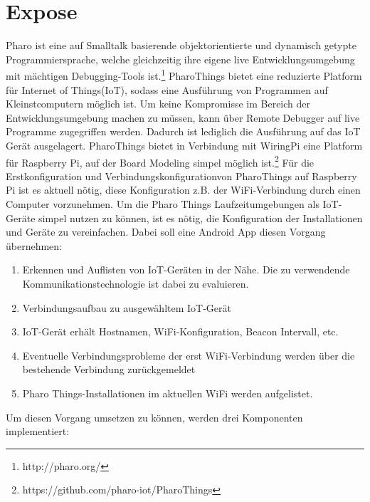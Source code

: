 \documentclass[12pt,a4paper]{article}
\begin{document}
    \section{Expose}
        Pharo ist eine auf Smalltalk basierende objektorientierte und dynamisch getypte Programmiersprache,
        welche gleichzeitig ihre eigene live Entwicklungsumgebung mit mächtigen Debugging-Tools ist.\footnote{http://pharo.org/}
        PharoThings bietet eine reduzierte Platform für  Internet of Things(IoT), sodass eine Ausführung von Programmen auf Kleinstcomputern möglich ist.
        Um keine Kompromisse im Bereich der Entwicklungsumgebung machen zu müssen, kann über Remote Debugger auf live Programme zugegriffen werden.
        Dadurch ist lediglich die Ausführung auf das IoT Gerät ausgelagert. PharoThings bietet in Verbindung mit WiringPi eine Platform für Raspberry Pi,
        auf der Board Modeling simpel möglich ist.\footnote{https://github.com/pharo-iot/PharoThings}
        Für die Erstkonfiguration und Verbindungskonfigurationvon PharoThings auf Raspberry Pi ist es aktuell nötig,
        diese Konfiguration z.B. der WiFi-Verbindung durch einen Computer vorzunehmen.
        Um die Pharo Things Laufzeitumgebungen als IoT-Geräte simpel nutzen zu können, ist es nötig,
        die Konfiguration der Installationen und Geräte zu vereinfachen. Dabei soll eine Android App diesen Vorgang übernehmen:
        \begin{enumerate}
            \item Erkennen und Auflisten von IoT-Geräten in der Nähe. Die zu verwendende Kommunikationstechnologie ist dabei zu evaluieren.
            \item Verbindungsaufbau zu ausgewähltem IoT-Gerät
            \item IoT-Gerät erhält Hostnamen, WiFi-Konfiguration, Beacon Intervall, etc.
            \item Eventuelle Verbindungsprobleme der erst WiFi-Verbindung werden über die bestehende Verbindung zurückgemeldet
            \item Pharo Things-Installationen im aktuellen WiFi werden aufgelistet.
        \end{enumerate}
        Um diesen Vorgang umsetzen zu können, werden drei Komponenten implementiert:
\end{document}
